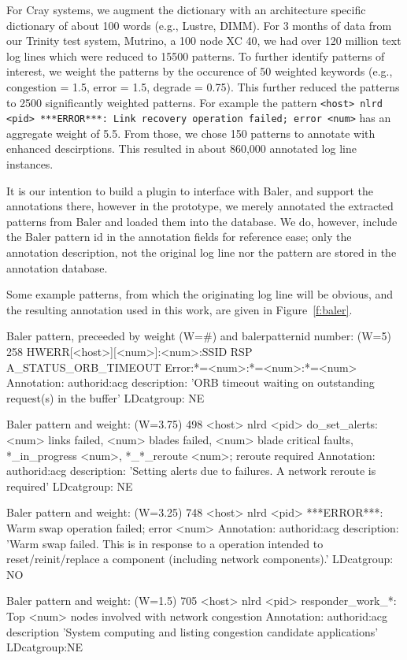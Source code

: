 For Cray systems, we augment
the dictionary with an architecture specific dictionary of about 100 words (e.g., Lustre, DIMM).
For 3 months of data from our Trinity test system, Mutrino, a 100 node XC 40,
we had over 120 million text log lines which were reduced to 15500 patterns. To further identify patterns
of interest, we weight the patterns by the occurence of 50 weighted
keywords (e.g., congestion = 1.5, error = 1.5, degrade = 0.75). This further reduced the patterns
to 2500 significantly weighted patterns. For example the pattern
\texttt{<host> nlrd <pid> ***ERROR***: Link recovery operation failed; error <num>} has
an aggregate weight of 5.5. From those, we chose 150
patterns to annotate with enhanced descirptions. This resulted in about 860,000
annotated log line instances.

It is our intention to
build a plugin to interface with Baler, and support the annotations there,
however in the prototype, we merely annotated the extracted patterns from
Baler and loaded them into the database.
We do, however, include the Baler pattern id in the annotation fields
for reference ease; only the annotation description, not the original log line nor the pattern
are stored in the annotation database.

Some example patterns, from which the originating log line will be obvious, and
the resulting annotation used in this work, are given in Figure~\ref{f:baler}.

\begin{figure*}
\begin{annol}

Baler pattern, preceeded by weight (W=#) and balerpatternid number:
(W=5)        258   HWERR[<host>][<num>]:<num>:SSID RSP A_STATUS_ORB_TIMEOUT Error:*=<num>:*=<num>:*=<num>
Annotation:
authorid:acg  description: 'ORB timeout waiting on outstanding request(s) in the buffer'  LDcatgroup: NE

Baler pattern and weight:
(W=3.75)     498   <host> nlrd <pid> do_set_alerts: <num> links failed, <num> blades failed, <num> blade critical faults, *_in_progress <num>, *_*_reroute <num>; reroute required
Annotation:
authorid:acg  description: 'Setting alerts due to failures. A network reroute is required' LDcatgroup: NE

Baler pattern and weight:
(W=3.25)     748   <host> nlrd <pid> ***ERROR***: Warm swap operation failed; error <num>
Annotation:
authorid:acg description: 'Warm swap failed. This is in response to a operation intended to reset/reinit/replace a component (including network components).' LDcatgroup: NO

Baler pattern and weight:
(W=1.5)      705   <host> nlrd <pid> responder_work_*: Top <num> nodes involved with network congestion
Annotation:
authorid:acg description 'System computing and listing congestion candidate applications' LDcatgroup:NE
\end{annol}
\caption{Example Baler patterns extracted from log lines and their annotated versions. Events to annotate are based on
knowledge of significant events. Annotation descriptions can provide additional context to non-self-explanatory log messages.}
\label{f:baler}
\end{figure*}


